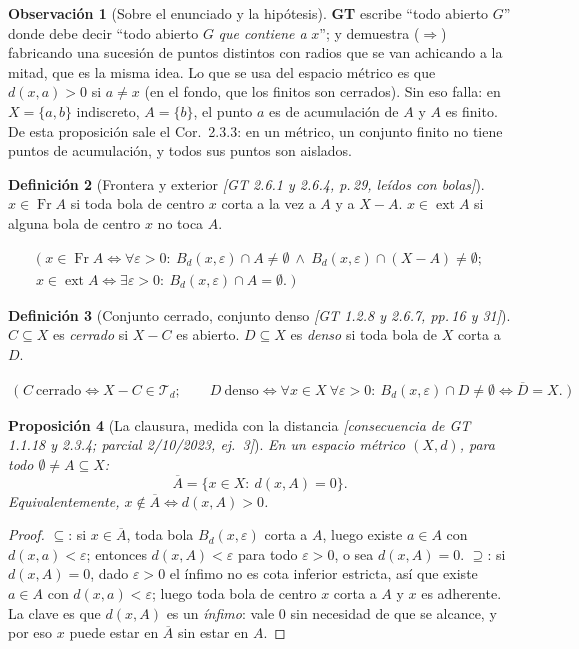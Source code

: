\documentclass[11pt,a4paper]{article}
\newcommand{\lgc}[1]{\par\vspace{-3pt}\begin{gather*}\big(\;#1\;\big)\end{gather*}\vspace{-6pt}}
\theoremstyle{definition}
\newtheorem{definicion}{Definición}[section]
\newtheorem{observacion}[definicion]{Observación}
\theoremstyle{plain}
\newtheorem{proposicion}[definicion]{Proposición}
\newcommand{\fnt}[1]{{\normalfont\small\itshape\color{gray!150!black}[#1]}}
\newcommand{\cl}[1]{\overline{#1}}
\newcommand{\fr}{\operatorname{Fr}}
\newcommand{\ext}{\operatorname{ext}}
\newcommand{\Bola}[2]{B_d(#1,#2)}
\newcommand{\tp}{\mathcal{T}}
\begin{document}
\begin{observacion}[Sobre el enunciado y la hipótesis]
\textbf{GT} escribe ``todo abierto $G$'' donde debe decir ``todo abierto $G$ \emph{que contiene a} $x$''; y demuestra ($\Rightarrow$) fabricando una sucesión de puntos distintos con radios que se van achicando a la mitad, que es la misma idea. Lo que se usa del espacio métrico es que $d(x,a)>0$ si $a\ne x$ (en el fondo, que los finitos son cerrados). Sin eso falla: en $X=\{a,b\}$ indiscreto, $A=\{b\}$, el punto $a$ es de acumulación de $A$ y $A$ es finito. De esta proposición sale el Cor.\ 2.3.3: en un métrico, un conjunto finito no tiene puntos de acumulación, y todos sus puntos son aislados.
\end{observacion}

\begin{definicion}[Frontera y exterior \fnt{GT 2.6.1 y 2.6.4, p.\,29, leídos con bolas}]
$x\in\fr A$ si toda bola de centro $x$ corta a la vez a $A$ y a $X-A$. $x\in\ext A$ si alguna bola de centro $x$ no toca $A$.
\lgc{x\in\fr A\iff \forall\varepsilon>0:\ \Bola{x}{\varepsilon}\cap A\ne\emptyset\ \wedge\ \Bola{x}{\varepsilon}\cap(X-A)\ne\emptyset;\\
x\in\ext A\iff \exists\varepsilon>0:\ \Bola{x}{\varepsilon}\cap A=\emptyset.}
\end{definicion}

\begin{definicion}[Conjunto cerrado, conjunto denso \fnt{GT 1.2.8 y 2.6.7, pp.\,16 y 31}]
$C\subseteq X$ es \emph{cerrado} si $X-C$ es abierto. $D\subseteq X$ es \emph{denso} si toda bola de $X$ corta a $D$.
\lgc{C\ \text{cerrado}\iff X-C\in\tp_d;\qquad
D\ \text{denso}\iff \forall x\in X\ \forall\varepsilon>0:\ \Bola{x}{\varepsilon}\cap D\ne\emptyset\iff \cl D=X.}
\end{definicion}

\begin{proposicion}[La clausura, medida con la distancia \fnt{consecuencia de GT 1.1.18 y 2.3.4; parcial 2/10/2023, ej.\ 3}]
En un espacio métrico $(X,d)$, para todo $\emptyset\ne A\subseteq X$:
\[
\cl A=\{x\in X:\ d(x,A)=0\}.
\]
Equivalentemente, $x\notin\cl A\iff d(x,A)>0$.
\end{proposicion}

\begin{proof}
$\subseteq$: si $x\in\cl A$, toda bola $\Bola{x}{\varepsilon}$ corta a $A$, luego existe $a\in A$ con $d(x,a)<\varepsilon$; entonces $d(x,A)<\varepsilon$ para todo $\varepsilon>0$, o sea $d(x,A)=0$.
$\supseteq$: si $d(x,A)=0$, dado $\varepsilon>0$ el ínfimo no es cota inferior estricta, así que existe $a\in A$ con $d(x,a)<\varepsilon$; luego toda bola de centro $x$ corta a $A$ y $x$ es adherente. La clave es que $d(x,A)$ es un \emph{ínfimo}: vale $0$ sin necesidad de que se alcance, y por eso $x$ puede estar en $\cl A$ sin estar en $A$.
\end{proof}
\end{document}

